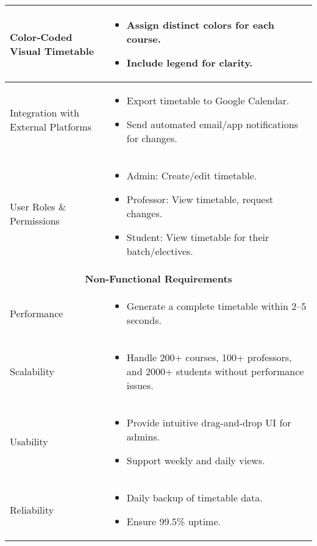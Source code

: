 \documentclass[12pt]{article}
\begin{document}
\begin{longtable}{|p{6cm}|p{8cm}|}
Color-Coded Visual Timetable &
\begin{itemize}
    \item Assign distinct colors for each course.
    \item Include legend for clarity.
\end{itemize} \\
\hline

Integration with External Platforms &
\begin{itemize}
    \item Export timetable to Google Calendar.
    \item Send automated email/app notifications for changes.
\end{itemize} \\
\hline

User Roles \& Permissions &
\begin{itemize}
    \item Admin: Create/edit timetable.
    \item Professor: View timetable, request changes.
    \item Student: View timetable for their batch/electives.
\end{itemize} \\
\hline

\multicolumn{2}{|c|}{\textbf{Non-Functional Requirements}} \\
\hline

Performance &
\begin{itemize}
    \item Generate a complete timetable within 2--5 seconds.
\end{itemize} \\
\hline

Scalability &
\begin{itemize}
    \item Handle 200+ courses, 100+ professors, and 2000+ students without performance issues.
\end{itemize} \\
\hline

Usability &
\begin{itemize}
    \item Provide intuitive drag-and-drop UI for admins.
    \item Support weekly and daily views.
\end{itemize} \\
\hline

Reliability &
\begin{itemize}
    \item Daily backup of timetable data.
    \item Ensure 99.5\% uptime.
\end{itemize} \\
\hline


\end{longtable}
\end{document}
